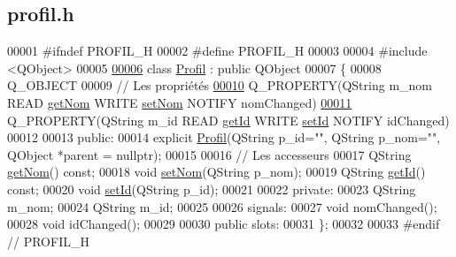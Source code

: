 \hypertarget{profil_8h_source}{}\subsection{profil.\+h}
\label{profil_8h_source}

\begin{DoxyCode}
00001 \textcolor{preprocessor}{#ifndef PROFIL\_H}
00002 \textcolor{preprocessor}{#define PROFIL\_H}
00003 
00004 \textcolor{preprocessor}{#include <QObject>}
00005 
\hyperlink{class_profil}{00006} \textcolor{keyword}{class }\hyperlink{class_profil}{Profil} : \textcolor{keyword}{public} QObject
00007 \{
00008     Q\_OBJECT
00009     \textcolor{comment}{// Les propriétés}
\hyperlink{class_profil_a5159c0fa27b964d20813a51a56cab0dc}{00010}     Q\_PROPERTY(QString m\_nom READ \hyperlink{class_profil_aac46cc403319711f8ed5aef3fc1d0011}{getNom} WRITE \hyperlink{class_profil_a020bcb3d28350b10c58f86ab093719cd}{setNom} NOTIFY nomChanged)
\hyperlink{class_profil_a181301ab1db188efb1e7c1574f6be917}{00011}     Q\_PROPERTY(QString m\_id READ \hyperlink{class_profil_ab6281942d5ebe10cb3b38589fc353ff6}{getId} WRITE \hyperlink{class_profil_a1b8f1741f5a201f50f6f8d6cb274c5c0}{setId} NOTIFY idChanged)
00012 
00013 public:
00014     explicit \hyperlink{class_profil}{Profil}(QString p\_id="", QString p\_nom="", QObject *parent = \textcolor{keywordtype}{nullptr});
00015 
00016     \textcolor{comment}{// Les accesseurs}
00017     QString \hyperlink{class_profil_aac46cc403319711f8ed5aef3fc1d0011}{getNom}() const;
00018     \textcolor{keywordtype}{void} \hyperlink{class_profil_a020bcb3d28350b10c58f86ab093719cd}{setNom}(QString p\_nom);
00019     QString \hyperlink{class_profil_ab6281942d5ebe10cb3b38589fc353ff6}{getId}() const;
00020     \textcolor{keywordtype}{void} \hyperlink{class_profil_a1b8f1741f5a201f50f6f8d6cb274c5c0}{setId}(QString p\_id);
00021 
00022 private:
00023     QString m\_nom;
00024     QString m\_id;
00025 
00026 signals:
00027     \textcolor{keywordtype}{void} nomChanged();
00028     \textcolor{keywordtype}{void} idChanged();
00029 
00030 public slots:
00031 \};
00032 
00033 \textcolor{preprocessor}{#endif // PROFIL\_H}
\end{DoxyCode}
